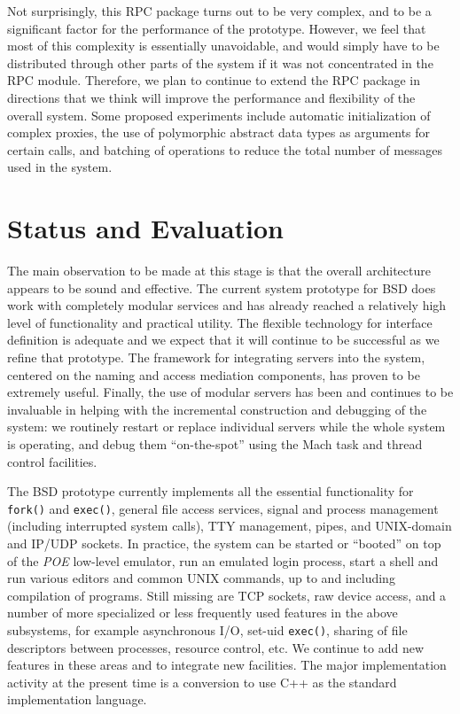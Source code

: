 Not surprisingly, this RPC package turns out to be very complex, and
to be a significant factor for the performance of the prototype.
However, we feel that most of this complexity is essentially
unavoidable, and would simply have to be distributed through other
parts of the system if it was not concentrated in the RPC module.
Therefore, we plan to continue to extend the RPC package in directions
that we think will improve the performance and flexibility of the
overall system. Some proposed experiments include automatic
initialization of complex proxies, the use of polymorphic abstract
data types as arguments for certain calls, and batching of operations
to reduce the total number of messages used in the system.


\section{Status and Evaluation}

The main observation to be made at this stage is that the overall
architecture appears to be sound and effective. The current system
prototype for BSD does work with completely modular services and has
already reached a relatively high level of functionality and practical
utility. The flexible technology for interface definition is adequate
and we expect that it will continue to be successful as we refine that
prototype.  The framework for integrating servers into the system,
centered on the naming and access mediation components, has proven to
be extremely useful.  Finally, the use of modular servers has been and
continues to be invaluable in helping with the incremental
construction and debugging of the system: we routinely restart or
replace individual servers while the whole system is operating, and
debug them ``on-the-spot'' using the Mach task and thread control
facilities.

The BSD prototype currently implements all the essential functionality
for {\tt fork()} and {\tt exec()}, general file access services,
signal and process management (including interrupted system calls),
TTY management, pipes, and UNIX-domain and IP/UDP sockets. In
practice, the system can be started or ``booted'' on top of the {\em
POE} low-level emulator, run an emulated login process, start a shell
and run various editors and common UNIX commands, up to and including
compilation of programs. Still missing are TCP sockets, raw device
access, and a number of more specialized or less frequently used
features in the above subsystems, for example asynchronous I/O,
set-uid {\tt exec()}, sharing of file descriptors between processes,
resource control, etc.  We continue to add new features in these areas
and to integrate new facilities.  The major implementation activity at
the present time is a conversion to use C++ as the standard
implementation language.

